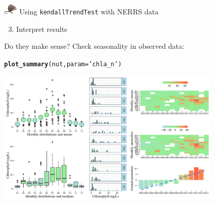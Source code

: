 \documentclass[xcolor=dvipsnames,serif]{beamer}\usepackage[]{graphicx}\usepackage[]{color}
\makeatletter
\newcommand{\hlstr}[1]{\textcolor[rgb]{0.192,0.494,0.8}{#1}}%
\newcommand{\hlstd}[1]{\textcolor[rgb]{0.345,0.345,0.345}{#1}}%
\newcommand{\hlkwc}[1]{\textcolor[rgb]{0.333,0.667,0.333}{#1}}%
\newcommand{\hlkwd}[1]{\textcolor[rgb]{0.737,0.353,0.396}{\textbf{#1}}}%
\newenvironment{kframe}{%
 \def\at@end@of@kframe{}%
 \ifinner\ifhmode%
  \def\at@end@of@kframe{\end{minipage}}%
  \begin{minipage}{\columnwidth}%
 \fi\fi%
 \def\FrameCommand##1{\hskip\@totalleftmargin \hskip-\fboxsep
 \colorbox{shadecolor}{##1}\hskip-\fboxsep
     \hskip-\linewidth \hskip-\@totalleftmargin \hskip\columnwidth}%
 \MakeFramed {\advance\hsize-\width
   \@totalleftmargin\z@ \linewidth\hsize
   \@setminipage}}%
 {\par\unskip\endMakeFramed%
 \at@end@of@kframe}
\newenvironment{knitrout}{}{} %
\makeatother
\begin{document}
\begin{frame}[fragile, t]{\includegraphics[width = 0.05\textwidth]{imgs/swmprat.png} Using \texttt{kendallTrendTest} with NERRS data}
\begin{enumerate}
\setcounter{enumi}{2}
\item Interpret results
\end{enumerate}
Do they make sense? Check seasonality in observed data:
\begin{knitrout}\scriptsize
{}\color{fgcolor}\begin{kframe}
\begin{alltt}
\hlkwd{plot_summary}\hlstd{(nut,} \hlkwc{param} \hlstd{=} \hlstr{'chla_n'}\hlstd{)}
\end{alltt}
\end{kframe}

{\centering \includegraphics[width=0.8\textwidth]{imgs/unnamed-chunk-9-1} 

}



\end{knitrout}
\end{frame}
\end{document}
